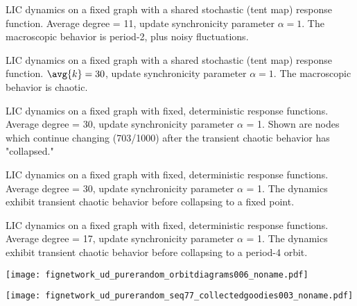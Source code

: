 \begin{frame}
  \begin{block}{}
    \small 
    LIC dynamics on a fixed
    graph with a shared stochastic (tent map) response
    function. Average degree = 11, update synchronicity parameter
    $\alpha = 1$. The macroscopic behavior is period-2, plus noisy
    fluctuations.
  \end{block}
\end{frame}

\begin{frame}
  \begin{block}{}
    \small
    LIC dynamics on a fixed graph with a
    shared stochastic (tent map) response function. $\avg{k} = 30$,
    update synchronicity parameter $\alpha = 1$.
    The macroscopic behavior is
    chaotic.
  \end{block}
\end{frame}

\begin{frame}
  \begin{block}{}
    \small
    LIC dynamics on a fixed graph with
    fixed, deterministic response functions. Average degree = 30,
    update synchronicity parameter $\alpha$ = 1. Shown are nodes
    which continue changing (703/1000) after the transient chaotic
    behavior has "collapsed."
  \end{block}
\end{frame}

\begin{frame}
  \begin{block}{}
    \small
    LIC dynamics on a fixed graph with fixed, deterministic response
    functions. Average degree = 30, update synchronicity parameter
    $\alpha$ = 1. The dynamics exhibit transient chaotic behavior before
    collapsing to a fixed point.
  \end{block}
\end{frame}

\begin{frame}
  \begin{block}{}
    \small
    LIC dynamics on a fixed graph with fixed, deterministic response
    functions. Average degree = 17, update synchronicity parameter
    $\alpha$ = 1. The dynamics exhibit transient chaotic behavior before
    collapsing to a period-4 orbit.
  \end{block}
\end{frame}


\begin{frame}[plain]

  \texttt{[image: fignetwork\_ud\_purerandom\_orbitdiagrams006\_noname.pdf]}

\end{frame}


\begin{frame}[plain]
  
  \texttt{[image: fignetwork\_ud\_purerandom\_seq77\_collectedgoodies003\_noname.pdf]}

\end{frame}



